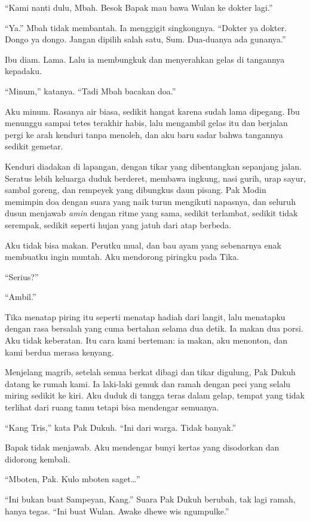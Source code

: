 \documentclass[11pt,twoside,openany]{book}
\makeatletter
\newcommand{\scenebreak}{\par\vspace{0.9em}{\centering\textsc{*\hspace{0.7em}*\hspace{0.7em}*}\par}\vspace{0.9em}\@afterindentfalse\@afterheading}
\makeatother
\begin{document}
``Kami nanti dulu, Mbah. Besok Bapak mau bawa Wulan ke dokter lagi.''

``Ya.'' Mbah tidak membantah. Ia menggigit singkongnya. ``Dokter ya dokter. Dongo ya dongo. Jangan dipilih salah satu, Sum. Dua-duanya ada gunanya.''

Ibu diam. Lama. Lalu ia membungkuk dan menyerahkan gelas di tangannya kepadaku.

``Minum,'' katanya. ``Tadi Mbah bacakan doa.''

Aku minum. Rasanya air biasa, sedikit hangat karena sudah lama dipegang. Ibu menunggu sampai tetes terakhir habis, lalu mengambil gelas itu dan berjalan pergi ke arah kenduri tanpa menoleh, dan aku baru sadar bahwa tangannya sedikit gemetar.

\scenebreak
Kenduri diadakan di lapangan, dengan tikar yang dibentangkan sepanjang jalan. Seratus lebih keluarga duduk berderet, membawa ingkung, nasi gurih, urap sayur, sambal goreng, dan rempeyek yang dibungkus daun pisang. Pak Modin memimpin doa dengan suara yang naik turun mengikuti napasnya, dan seluruh dusun menjawab \emph{amin} dengan ritme yang sama, sedikit terlambat, sedikit tidak serempak, sedikit seperti hujan yang jatuh dari atap berbeda.

Aku tidak bisa makan. Perutku mual, dan bau ayam yang sebenarnya enak membuatku ingin muntah. Aku mendorong piringku pada Tika.

``Serius?''

``Ambil.''

Tika menatap piring itu seperti menatap hadiah dari langit, lalu menatapku dengan rasa bersalah yang cuma bertahan selama dua detik. Ia makan dua porsi. Aku tidak keberatan. Itu cara kami berteman: ia makan, aku menonton, dan kami berdua merasa kenyang.

Menjelang magrib, setelah semua berkat dibagi dan tikar digulung, Pak Dukuh datang ke rumah kami. Ia laki-laki gemuk dan ramah dengan peci yang selalu miring sedikit ke kiri. Aku duduk di tangga teras dalam gelap, tempat yang tidak terlihat dari ruang tamu tetapi bisa mendengar semuanya.

``Kang Tris,'' kata Pak Dukuh. ``Ini dari warga. Tidak banyak.''

Bapak tidak menjawab. Aku mendengar bunyi kertas yang disodorkan dan didorong kembali.

``Mboten, Pak. Kulo mboten saget\ldots{}''

``Ini bukan buat Sampeyan, Kang.'' Suara Pak Dukuh berubah, tak lagi ramah, hanya tegas. ``Ini buat Wulan. Awake dhewe wis ngumpulke.''
\end{document}
